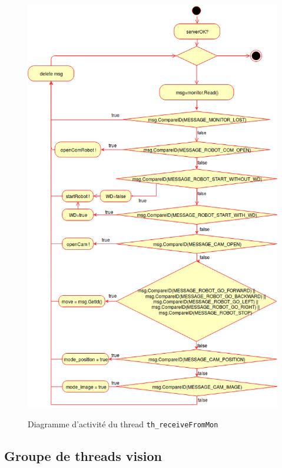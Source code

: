 \documentclass[11pt, a4paper]{paper}
\begin{document}
\begin{figure}[htp]
\label{fig:act_communiquer}
\begin{center}
{\includegraphics[scale=.4]{./dossier_conception/th_receiveFromMon.png}}
{\caption{Diagramme d'activité du thread {\tt th\_receiveFromMon}}}
\end{center}
\end{figure}

\subsection{Groupe de threads vision}
\end{document}
